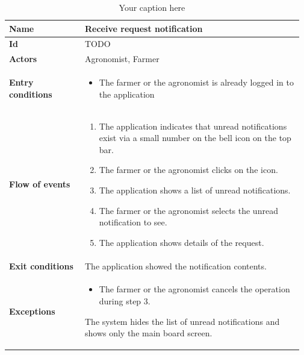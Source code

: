 \begin{table}[H]
    \centering
	\begin{tabular}{@{}p{0.25\linewidth} p{0.72\linewidth}@{}}
		\toprule
		\textbf{Name}               & Receive request notification\\
		\midrule
		\textbf{Id}                 & TODO\\
		\midrule
		\textbf{Actors}             & Agronomist, Farmer\\
		\midrule
		
		\textbf{Entry conditions}   & \begin{itemize}[leftmargin=.4cm,noitemsep,topsep=0pt,before=\vspace{-3mm},after=\vspace{-4mm}]
		    \item The farmer or the agronomist is already logged in to the application
		\end{itemize}\\
		\midrule
		
		\textbf{Flow of events}     & \begin{enumerate}[leftmargin=.4cm,noitemsep,topsep=0pt,before=\vspace{-3mm},after=\vspace{-4mm}]
		    \item The application indicates that unread notifications exist via a small number on the bell icon on the top bar.
		    \item The farmer or the agronomist clicks on the icon.
		    \item The application shows a list of unread notifications.
		    \item The farmer or the agronomist selects the unread notification to see.
		    \item The application shows details of the request.
		\end{enumerate}\\
		\midrule
		\textbf{Exit conditions}    & The application showed the notification contents. \\
		\midrule
		
		\textbf{Exceptions}         & \begin{itemize}[leftmargin=.4cm,noitemsep,topsep=0pt,before=\vspace{-3mm}]
		   \item The farmer or the agronomist cancels the operation during step 3.
		\end{itemize}
	    The system hides the list of unread notifications and shows only the main board screen.\\
		\bottomrule
	\end{tabular}
	\caption{Your caption here} 
\end{table}


